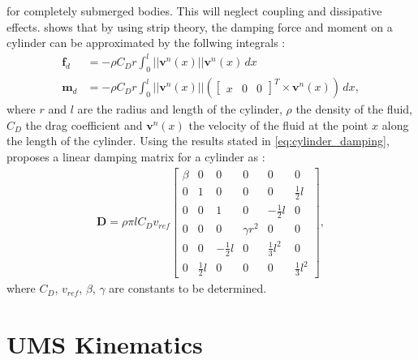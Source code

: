 for completely submerged bodies. This will neglect coupling and dissipative effects.
\citeauthor{mcmillan1995} shows that by using strip theory, the damping force and
moment on a cylinder can be approximated by the follwing integrals \cite{mcmillan1995}:
\begin{subequations}
    \label{eq:cylinder_damping}
    \begin{align}
        \bm{f}_d &= - \rho C_D r \int_{0}^{l} ||\bm{v}^n(x)|| \bm{v}^n(x) \,dx \\
        \bm{m}_d &= - \rho C_D r \int_{0}^{l} ||\bm{v}^n(x)||
        \left(\begin{bmatrix}x & 0 & 0\end{bmatrix}^T \times \bm{v}^n(x)\right) \,dx,
    \end{align}
\end{subequations}
where $r$ and $l$ are the radius and length of the cylinder, $\rho$ the density
of the fluid, $C_D$ the drag coefficient and $\bm{v}^n(x)$ the velocity of the
fluid at the point $x$ along the length of the cylinder. Using the results stated
in \autoref{eq:cylinder_damping}, \citeauthor{schmidt2018} proposes a linear
damping matrix for a cylinder as \cite{schmidt2018}:
\begin{align}
    \bm{D} = \rho \pi l C_D v_{ref}
    \begin{bmatrix}
        \beta &            0 &             0 &          0 &              0 &            0 \\
            0 &            1 &             0 &          0 &              0 & \frac{1}{2}l \\
            0 &            0 &             1 &          0 &  -\frac{1}{2}l &            0 \\
            0 &            0 &             0 & \gamma r^2 &              0 &            0 \\
            0 &            0 & -\frac{1}{2}l &          0 & \frac{1}{3}l^2 &            0 \\
            0 & \frac{1}{2}l &             0 &          0 &              0 & \frac{1}{3}l^2
    \end{bmatrix},
\end{align}
where $C_D$, $v_{ref}$, $\beta$, $\gamma$ are constants to be determined.

\iffalse
\section{UMS Kinematics}

